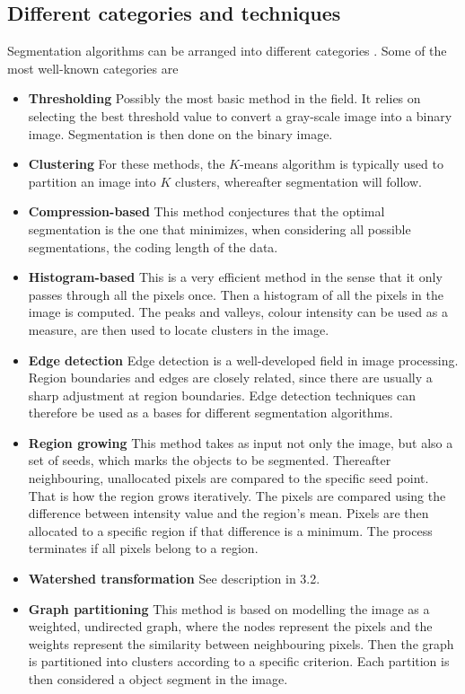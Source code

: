 \documentclass[a4paper,10pt]{article}
\begin{document}
\subsection{Different categories and techniques}
Segmentation algorithms can be arranged into different categories \cite{is}.  Some of the most well-known categories are
\begin{itemize}
 \item \textbf{Thresholding} \cite{is} Possibly the most basic method in the field.  It relies on selecting the best threshold value to convert a gray-scale image into a binary image.  Segmentation is then done on the binary image. 
 \item \textbf{Clustering} \cite{is} For these methods, the $K$-means algorithm is typically used to partition an image into $K$ clusters, whereafter segmentation will follow.
 \item \textbf{Compression-based} \cite{is} This method conjectures that the optimal segmentation is the one that minimizes, when considering all possible segmentations, the coding length of the data.
 \item \textbf{Histogram-based} \cite{is} This is a very efficient method in the sense that it only passes through all the pixels once.  Then a histogram of all the pixels in the image is computed.  The peaks and valleys, colour intensity can be used as a measure, are then used to locate clusters in the image.
 \item \textbf{Edge detection} \cite{is} Edge detection is a well-developed field in image processing.  Region boundaries and edges are closely related, since there are usually a sharp adjustment at region boundaries.  Edge detection techniques can therefore be used as a bases for different segmentation algorithms.  
 \item \textbf{Region growing} \cite{is}  This method takes as input not only the image, but also a set of seeds, which marks the objects to be segmented.  Thereafter neighbouring, unallocated pixels are compared to the specific seed point.  That is how the region grows iteratively.  The pixels are compared using the difference between intensity value and the region's mean.  Pixels are then allocated to a specific region if that difference is a minimum.  The process terminates if all pixels belong to a region.  
 \item \textbf{Watershed transformation} \cite{is} See description in 3.2.    
 \item \textbf{Graph partitioning} \cite{is} This method is based on modelling the image as a weighted, undirected graph, where the nodes represent the pixels and the weights represent the similarity between neighbouring pixels. Then the graph is partitioned into clusters according to a specific criterion.  Each partition is then considered a object segment in the image.       

\end{itemize}
\end{document}
